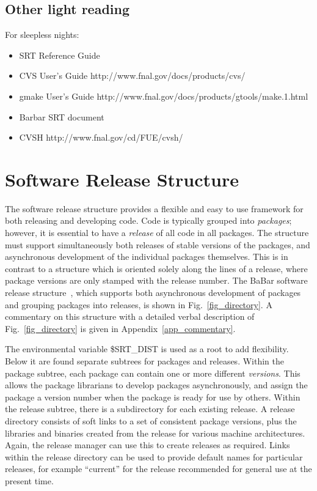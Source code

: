 \documentclass[12pt]{article}
\begin{document}
\subsection{Other light reading}

For sleepless nights:
\begin{itemize}
\item SRT Reference Guide
\item CVS User's Guide http://www.fnal.gov/docs/products/cvs/
\item gmake User's Guide http://www.fnal.gov/docs/products/gtools/make.1.html
\item Barbar SRT document
\item CVSH http://www.fnal.gov/cd/FUE/cvsh/ 
\end{itemize}

\section{Software Release Structure}
The software release structure provides a flexible and easy to use
framework for both releasing and developing code.  Code is typically grouped
into {\em packages}; however, it is essential to have a {\em release} of all 
code in 
all packages. The structure must support simultaneously both
releases of stable versions of the 
packages, and asynchronous development of 
the individual packages themselves.  This is in contrast to a structure which
is oriented solely along the lines of a release, where package versions
are only stamped with the release number. The BaBar software release
structure~\cite{ref_babar1,ref_babar2}, which supports both
asynchronous development of packages 
and grouping packages into 
releases,
is shown in Fig.~\ref{fig_directory}. A commentary on this structure with 
a detailed verbal description of Fig.~\ref{fig_directory} is given in 
Appendix~\ref{app_commentary}.

The environmental variable {\ttfamily \$SRT\_DIST} is used as a root to add flexibility.  
Below it are found separate subtrees for packages and releases. 
Within the
package subtree, each package can contain one or more different {\em versions}.
This allows the package librarians to develop packages 
asynchronously,
and assign the package a version number when the package is ready for use
by others.  Within the release subtree, there is a subdirectory for each
existing release.  A release directory consists of soft links to a set of 
consistent package versions, plus the libraries and binaries created from
the release for various machine architectures.  Again, the release manager
can use this to create releases as required.  Links within the release
directory can be used to provide default names for particular releases, for
example ``current'' for the release recommended for general use at the present
time.
\end{document}
